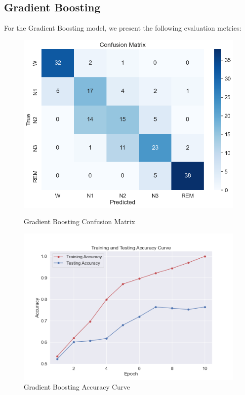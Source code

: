 \subsection{Gradient Boosting}

For the Gradient Boosting model, we present the following evaluation metrics:

\begin{figure}[H]
	\centering
	\begin{minipage}[t]{0.48\textwidth}
		\centering
		\includegraphics[width=\textwidth]{img/paper_1/confusion_matrix.png}
		\caption{Gradient Boosting Confusion Matrix}
	\end{minipage}
	\hfill
	\begin{minipage}[t]{0.48\textwidth}
		\centering
		\includegraphics[width=\textwidth]{img/paper_1/accuracy_curve.png}
		\caption{Gradient Boosting Accuracy Curve}
	\end{minipage}
	

\end{figure}
